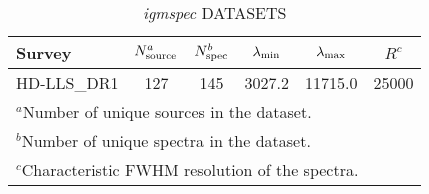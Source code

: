 \clearpage
\begin{table}[ht]
\caption{{\it igmspec} DATASETS \label{tab:datasets}}
\begin{tabular}{lccccc}
Survey & $N_{\rm source}^a$ 
& $N_{\rm spec}^b$ & $\lambda_{\rm min}$
& $\lambda_{\rm max}$ & $R^c$ \\ 
\hline 
HD-LLS\_DR1& 127& 145& 3027.2& 11715.0& 25000\\ 
\hline 
\multicolumn{6}{l}{{$^a$}{Number of unique sources in the dataset. }} \\ 
\multicolumn{6}{l}{{$^b$}{Number of unique spectra in the dataset. }} \\ 
\multicolumn{6}{l}{{$^c$}{Characteristic FWHM resolution of the spectra. }} \\ 
\end{tabular} 
\end{table} 
